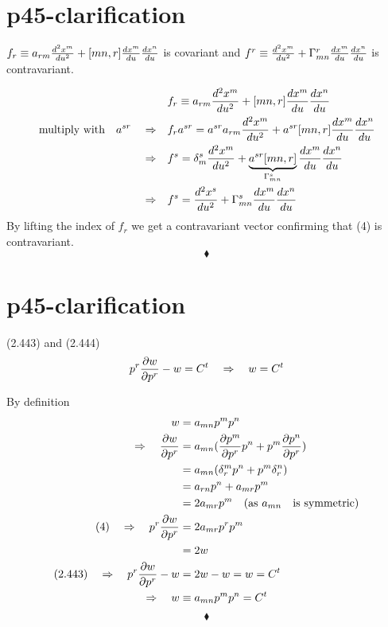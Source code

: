 \section{p45-clarification }
\begin{tcolorbox}
$ f_r \equiv a_{rm}\dv[2]{x^m}{u} +[mn,r]\dv{x^m}{u}\dv{x^n}{u}$ is covariant and 
$ f^r \equiv \dv[2]{x^m}{u} +\Gamma^r_{mn}\dv{x^m}{u}\dv{x^n}{u}$ is contravariant.
\end{tcolorbox}
\begin{align}
\ &f_r \equiv a_{rm}\dv[2]{x^m}{u} +[mn,r]\dv{x^m}{u}\dv{x^n}{u}\\
\text{multiply with}\quad a^{sr}\quad \Rightarrow\quad &f_r a^{sr} = a^{sr}a_{rm}\dv[2]{x^m}{u} +a^{sr}[mn,r]\dv{x^m}{u}\dv{x^n}{u}\\
\Rightarrow\quad &f^{s} = \delta^s_m \dv[2]{x^m}{u} +\underbrace{a^{sr}[mn,r]}_{\Gamma^s_{mn}}\dv{x^m}{u}\dv{x^n}{u}\\
\Rightarrow \quad &f^{s} = \dv[2]{x^s}{u} +\Gamma^s_{mn}\dv{x^m}{u}\dv{x^n}{u}
\end{align}
By lifting the index of $f_r$ we get a contravariant vector confirming that (4) is contravariant.
$$\blacklozenge$$
\newpage

\section{p45-clarification }
\begin{tcolorbox}
(2.443) and (2.444)
$$ p^r\pdv{w}{p^r} - w = C^t \quad \Rightarrow\quad w = C^t $$ 
\end{tcolorbox}
By definition 
\begin{align}
\ w &= a_{mn}p^mp^n\\
\Rightarrow\quad \pdv{w}{p^r} &= a_{mn}(\pdv{p^m}{p^r}p^n + p^m \pdv{p^n}{p^r})\\
\ &= a_{mn}(\delta^m_rp^n + p^m \delta^n_r)\\
\ &= a_{rn}p^n + a_{mr}p^m \\
\ &= 2a_{mr}p^m \quad\text{(as } a_{mn} \quad \text{is symmetric)}\\
\text{(4)}\quad \Rightarrow \quad p^r\pdv{w}{p^r} &= 2a_{mr}p^rp^m \\
\ &= 2w\\
\text{(2.443)} \quad\Rightarrow\quad p^r\pdv{w}{p^r} -w &= 2w-w = w = C^t\\
\Rightarrow\quad w &\equiv a_{mn}p^mp^n = C^t
\end{align}
$$\blacklozenge$$
\newpage


